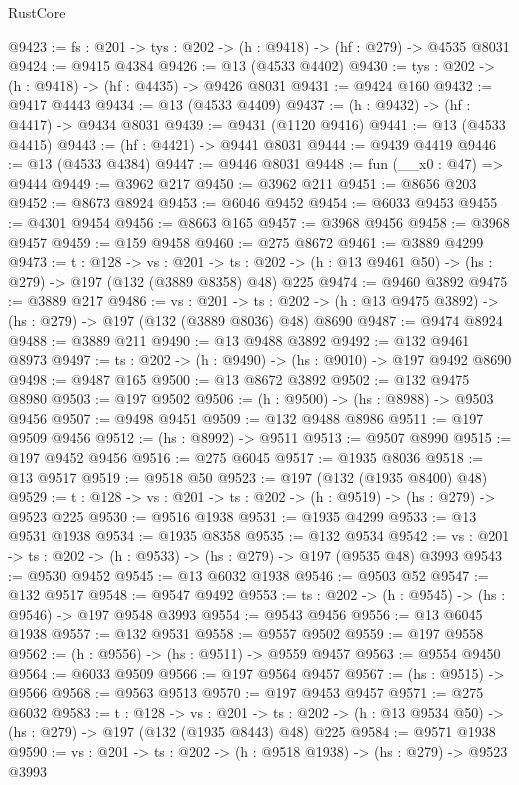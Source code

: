\begin{lexlean}{RustCore}
\begin{coremodule}
@9423 := {fs : @201} -> {tys : @202} -> (h : @9418) -> (hf : @279) -> @4535 @8031
@9424 := @9415 @4384
@9426 := @13 (@4533 @4402)
@9430 := {tys : @202} -> (h : @9418) -> (hf : @4435) -> @9426 @8031
@9431 := @9424 @160
@9432 := @9417 @4443
@9434 := @13 (@4533 @4409)
@9437 := (h : @9432) -> (hf : @4417) -> @9434 @8031
@9439 := @9431 (@1120 @9416)
@9441 := @13 (@4533 @4415)
@9443 := (hf : @4421) -> @9441 @8031
@9444 := @9439 @4419
@9446 := @13 (@4533 @4384)
@9447 := @9446 @8031
@9448 := fun (__x0 : @47) => @9444
@9449 := @3962 @217
@9450 := @3962 @211
@9451 := @8656 @203
@9452 := @8673 @8924
@9453 := @6046 @9452
@9454 := @6033 @9453
@9455 := @4301 @9454
@9456 := @8663 @165
@9457 := @3968 @9456
@9458 := @3968 @9457
@9459 := @159 @9458
@9460 := @275 @8672
@9461 := @3889 @4299
@9473 := {t : @128} ->
  {vs : @201} ->
  {ts : @202} -> (h : @13 @9461 @50) -> (hs : @279) -> @197 (@132 (@3889 @8358) @48) @225
@9474 := @9460 @3892
@9475 := @3889 @217
@9486 := {vs : @201} ->
  {ts : @202} -> (h : @13 @9475 @3892) -> (hs : @279) -> @197 (@132 (@3889 @8036) @48) @8690
@9487 := @9474 @8924
@9488 := @3889 @211
@9490 := @13 @9488 @3892
@9492 := @132 @9461 @8973
@9497 := {ts : @202} -> (h : @9490) -> (hs : @9010) -> @197 @9492 @8690
@9498 := @9487 @165
@9500 := @13 @8672 @3892
@9502 := @132 @9475 @8980
@9503 := @197 @9502
@9506 := (h : @9500) -> (hs : @8988) -> @9503 @9456
@9507 := @9498 @9451
@9509 := @132 @9488 @8986
@9511 := @197 @9509 @9456
@9512 := (hs : @8992) -> @9511
@9513 := @9507 @8990
@9515 := @197 @9452 @9456
@9516 := @275 @6045
@9517 := @1935 @8036
@9518 := @13 @9517
@9519 := @9518 @50
@9523 := @197 (@132 (@1935 @8400) @48)
@9529 := {t : @128} -> {vs : @201} -> {ts : @202} -> (h : @9519) -> (hs : @279) -> @9523 @225
@9530 := @9516 @1938
@9531 := @1935 @4299
@9533 := @13 @9531 @1938
@9534 := @1935 @8358
@9535 := @132 @9534
@9542 := {vs : @201} -> {ts : @202} -> (h : @9533) -> (hs : @279) -> @197 (@9535 @48) @3993
@9543 := @9530 @9452
@9545 := @13 @6032 @1938
@9546 := @9503 @52
@9547 := @132 @9517
@9548 := @9547 @9492
@9553 := {ts : @202} -> (h : @9545) -> (hs : @9546) -> @197 @9548 @3993
@9554 := @9543 @9456
@9556 := @13 @6045 @1938
@9557 := @132 @9531
@9558 := @9557 @9502
@9559 := @197 @9558
@9562 := (h : @9556) -> (hs : @9511) -> @9559 @9457
@9563 := @9554 @9450
@9564 := @6033 @9509
@9566 := @197 @9564 @9457
@9567 := (hs : @9515) -> @9566
@9568 := @9563 @9513
@9570 := @197 @9453 @9457
@9571 := @275 @6032
@9583 := {t : @128} ->
  {vs : @201} ->
  {ts : @202} -> (h : @13 @9534 @50) -> (hs : @279) -> @197 (@132 (@1935 @8443) @48) @225
@9584 := @9571 @1938
@9590 := {vs : @201} -> {ts : @202} -> (h : @9518 @1938) -> (hs : @279) -> @9523 @3993

\end{coremodule}
\end{lexlean}
